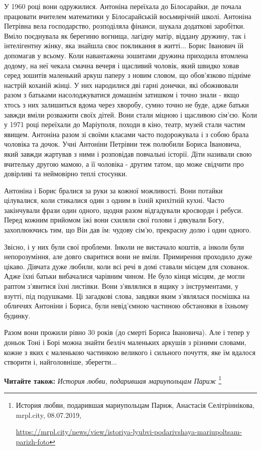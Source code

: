 
У 1960 році вони одружилися. Антоніна переїхала до Білосарайки, де почала
працювати вчителем математики у Білосарайській восьмирічній школі. Антоніна
Петрівна вела господарство, розподіляла фінанси, шукала додаткові заробітки.
Вміло поєднувала як берегиню вогнища, лагідну матір, віддану дружину, так і
інтелігентну жінку, яка знайшла своє покликання в житті... Борис Іванович їй
допомагав у всьому. Коли навантажена зошитами дружина приходила втомлена
додому, на неї чекала смачна вечеря і щасливий чоловік, який швидко ховав серед
зошитів маленький аркуш паперу з новим словом, що обов'язково підніме настрій
коханій жінці. У них народилися дві гарні донечки, які обожнювали разом з
батьками насолоджуватися домашнім затишком і точно знали - якщо хтось з них
залишиться вдома через хворобу, сумно точно не буде, адже батьки завжди вміли
розважити своїх дітей. Вони стали міцною і щасливою сім'єю. Коли у 1971 році
переїхали до Маріуполя, походи в кіно, театр, музей стали частим явищем.
Антоніна разом зі своїми класами часто подорожувала і з собою брала чоловіка та
дочок. Учні Антоніни Петрівни теж полюбили Бориса Івановича, який завжди
жартував з ними і розповідав повчальні історії. Діти називали свою вчительку
другою мамою, а її чоловіка - другим татом, що може свідчити про довірливі та
неймовірно теплі стосунки.


Антоніна і Борис  бралися за руки за кожної можливості. Вони потайки
цілувалися, коли стикалися один з одним в їхній крихітній кухні. Часто
закінчували фрази один одного, щодня разом відгадували кросворди і ребуси.
Перед кожним прийомом їжі вони схиляли свої голови і дякували Богу,
захоплюючись тим, що Він дав їм: чудову сім'ю, прекрасну долю і один одного.


Звісно, і у них були свої проблеми. Інколи не вистачало коштів, а інколи були
непорозуміння, але довго сваритися вони не вміли. Примирення проходило дуже
цікаво. Дівчата дуже любили, коли всі речі в домі ставали місцем для схованок.
Адже їхні батьки вибачалися чарівним чином. Не було кінця місцям, де могли
раптом з'явитися їхні листівки. Вони з'являлися в ящику з інструментами, у
взутті, під подушками. Ці загадкові слова, завдяки яким з'являлася посмішка на
обличчях Антоніни і Бориса, були невід'ємною частиною обстановки в їхньому
будинку.

Разом вони прожили рівно 30 років (до смерті Бориса Івановича). Але і тепер у
доньок Тоні і Борі можна знайти безліч маленьких аркушів з різними словами,
кожне з яких є маленькою частинкою великого і сильного почуття, яке їм вдалося
створити і, найголовніше, зберегти...

\textbf{Читайте також:} \emph{История любви, подарившая мариупольцам Париж}%
\footnote{История любви, подарившая мариупольцам Париж, Анастасія Селітріннікова, mrpl.city, 08.07.2019, \par%
\url{https://mrpl.city/news/view/istoriya-lyubvi-podarivshaya-mariupoltsam-parizh-foto}
}

